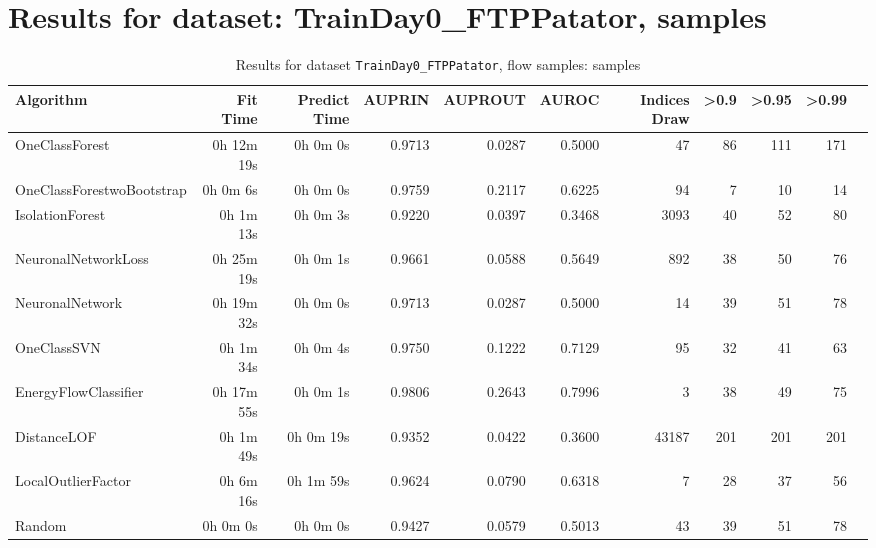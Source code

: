 \documentclass{article}
\begin{document}
\section*{Results for dataset: TrainDay0_FTPPatator, samples}
\begin{table}[h!]
\centering
\caption{Results for dataset \texttt{TrainDay0_FTPPatator}, flow samples: samples}
\label{tab:trainday0ftppatator_samples}
\begin{tabular}{lrrrrrrrrrr}
\toprule
Algorithm & Fit Time & Predict Time & AUPRIN & AUPROUT & AUROC & Indices Draw & >0.9 & >0.95 & >0.99 \\
\midrule
OneClassForest & 0h 12m 19s & 0h 0m 0s & 0.9713 & 0.0287 & 0.5000 & 47 & 86 & 111 & 171 \\
OneClassForestwoBootstrap & 0h 0m 6s & 0h 0m 0s & 0.9759 & 0.2117 & 0.6225 & 94 & 7 & 10 & 14 \\
IsolationForest & 0h 1m 13s & 0h 0m 3s & 0.9220 & 0.0397 & 0.3468 & 3093 & 40 & 52 & 80 \\
NeuronalNetworkLoss & 0h 25m 19s & 0h 0m 1s & 0.9661 & 0.0588 & 0.5649 & 892 & 38 & 50 & 76 \\
NeuronalNetwork & 0h 19m 32s & 0h 0m 0s & 0.9713 & 0.0287 & 0.5000 & 14 & 39 & 51 & 78 \\
OneClassSVN & 0h 1m 34s & 0h 0m 4s & 0.9750 & 0.1222 & 0.7129 & 95 & 32 & 41 & 63 \\
EnergyFlowClassifier & 0h 17m 55s & 0h 0m 1s & 0.9806 & 0.2643 & 0.7996 & 3 & 38 & 49 & 75 \\
DistanceLOF & 0h 1m 49s & 0h 0m 19s & 0.9352 & 0.0422 & 0.3600 & 43187 & 201 & 201 & 201 \\
LocalOutlierFactor & 0h 6m 16s & 0h 1m 59s & 0.9624 & 0.0790 & 0.6318 & 7 & 28 & 37 & 56 \\
Random & 0h 0m 0s & 0h 0m 0s & 0.9427 & 0.0579 & 0.5013 & 43 & 39 & 51 & 78 \\
\bottomrule
\end{tabular}
\end{table}
\end{document}
